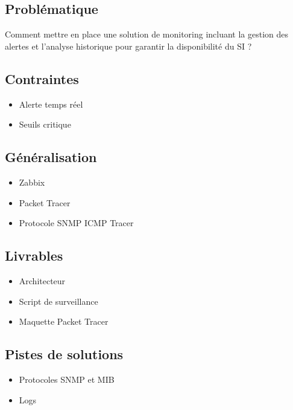 \subsection*{Problématique}
{}
\noindent Comment mettre en place une solution de monitoring incluant la gestion des alertes et l'analyse historique pour garantir la disponibilité du SI ?

\subsection*{Contraintes}
{}
\begin{itemize}
	\item Alerte temps réel
	\item Seuils critique 
\end{itemize}

\subsection*{Généralisation}
{}
\begin{itemize}
	\item Zabbix
	\item Packet Tracer
  \item Protocole SNMP ICMP Tracer
\end{itemize}

\subsection*{Livrables}
{}
\begin{itemize}
	\item Architecteur
	\item Script de surveillance
	\item Maquette Packet Tracer
\end{itemize}

\subsection*{Pistes de solutions}
{}
\begin{itemize}
	\item Protocoles SNMP et MIB
  \item Logs
\end{itemize}

